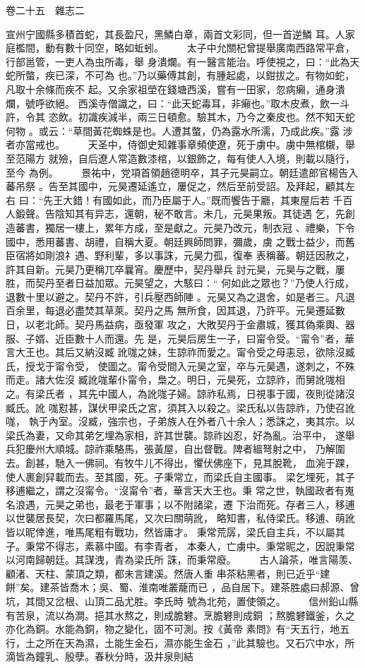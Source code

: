 \documentclass{ctexart}
\begin{document}
卷二十五　雜志二

宣州宁國縣多積首蛇，其長盈尺，黑鱗白章，兩首文彩同，但一首逆鱗 耳。人家庭檻間，動有數十同空，略如蚯蚓。 　　太子中允關杞曾提舉廣南西路常平倉，行部邕管，一吏人為虫所毒，舉 身潰爛。有一醫言能治。呼使視之，曰：``此為天蛇所螫，疾已深，不可為 也。''乃以藥傅其創，有腫起處，以鉗拔之。有物如蛇，凡取十余條而疾不 起。又余家祖塋在錢塘西溪，嘗有一田家，忽病癩，通身潰爛，號呼欲絕。 西溪寺僧識之，曰：``此天蛇毒耳，非癩也。''取木皮煮，飲一斗許，令其 恣飲。初識疾減半，兩三日頓愈。驗其木，乃今之秦皮也。然不知天蛇何物 。或云：``草間黃花蜘蛛是也。人遭其螫，仍為露水所濡，乃成此疾。''露 涉者亦當戒也。 　　天圣中，侍御史知雜事章頻使遼，死于虜中。虜中無棺櫬，舉至范陽方 就殮，自后遼人常造數漆棺，以銀飾之，每有使人入境，則載以隨行，至今 為例。 　　景祐中，党項首領趙德明卒，其子元昊嗣立。朝廷遣郎官楊告入蕃吊祭 。告至其國中，元昊遷延遙立，屢促之，然后至前受詔。及拜起，顧其左右 曰：``先王大錯！有國如此，而乃臣屬于人。''既而饗告于廳，其東屋后若 千百人鍛聲。告陰知其有异志，還朝，秘不敢言。未几，元昊果叛。其徒遇 乞，先創造蕃書，獨居一樓上，累年方成，至是獻之。元昊乃改元，制衣冠 、禮樂，下令國中，悉用蕃書、胡禮，自稱大夏。朝廷興師問罪，彌歲，虜 之戰士益少，而舊臣宿將如剛浪礻遇、野利輩，多以事誅，元昊力孤，復奉 表稱蕃。朝廷因赦之，許其自新。元昊乃更稱兀卒曩宵。慶歷中，契丹舉兵 討元昊，元昊与之戰，屢胜，而契丹至者日益加眾。元昊望之，大駭曰：`` 何如此之眾也？''乃使人行成，退數十里以避之。契丹不許，引兵壓西師陣 。元昊又為之退舍，如是者三。凡退百余里，每退必盡焚其草萊。契丹之馬 無所食，因其退，乃許平。元昊遷延數日，以老北師。契丹馬益病，亟發軍 攻之，大敗契丹于金肅城，獲其偽乘輿、器服、子婿、近臣數十人而還。先 是，元昊后房生一子，曰甯令受。``甯令''者，華言大王也。其后又納沒臧 訛哤之妹，生諒祚而愛之。甯令受之母恚忌，欲除沒臧氏，授戈于甯令受， 使圖之。甯令受間入元昊之室，卒与元昊遇，遂刺之，不殊而走。諸大佐沒 臧訛哤輩仆甯令，梟之。明日，元昊死，立諒祚，而舅訛哤相之。有梁氏者 ，其先中國人，為訛哤子婦。諒祚私焉，日視事于國，夜則從諸沒臧氏。訛 哤懟甚，謀伏甲梁氏之宮，須其入以殺之。梁氏私以告諒祚，乃使召訛哤， 執于內室。沒臧，強宗也，子弟族人在外者八十余人；悉誅之，夷其宗。以 梁氏為妻，又命其弟乞埋為家相，許其世襲。諒祚凶忍，好為亂。治平中， 遂舉兵犯慶州大順城。諒祚乘駱馬，張黃屋，自出督戰。陴者縕弩射之中， 乃解圍去。創甚，馳入一佛祠。有牧牛儿不得出，懼伏佛座下，見其脫靴， 血涴于踝，使人裹創舁載而去。至其國，死。子秉常立，而梁氏自主國事。 梁乞埋死，其子移逋繼之，謂之沒甯令。``沒甯令''者，華言天大王也。秉 常之世，執國政者有嵬名浪遇，元昊之弟也，最老于軍事；以不附諸梁，遷 下治而死。存者三人，移逋以世襲居長契，次曰都羅馬尾，又次曰關萌訛， 略知書，私侍梁氏。移逋、萌訛皆以昵倖進，唯馬尾粗有戰功，然皆庸才。 秉常荒孱，梁氏自主兵，不以屬其子。秉常不得志，素慕中國。有李青者， 本秦人，亡虜中。秉常昵之，因說秉常以河南歸朝廷。其謀洩，青為梁氏所 誅，而秉常廢。 　　古人論茶，唯言陽羡、顧渚、天柱、蒙頂之類，都未言建溪。然唐人重 串茶粘黑者，則已近乎``建餅''矣。建茶皆喬木；吳、蜀、淮南唯叢蘢而已 ，品自居下。建茶胜處曰郝源、曾坑，其間又岔根、山頂二品尤胜。李氏時 號為北苑，置使領之。 　　信州鉛山縣有苦泉，流以為澗。挹其水熬之，則成膽礬。烹膽礬則成銅 ；熬膽礬鐵釜，久之亦化為銅。水能為銅，物之變化，固不可測。按《黃帝 素問》有``天五行，地五行，土之所在天為濕，土能生金石，濕亦能生金石 ，''此其驗也。又石穴中水，所滴皆為鐘乳、殷孽。春秋分時，汲井泉則結 
\end{document}
